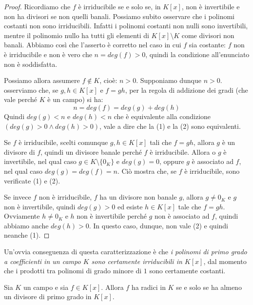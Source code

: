 \begin{proof}
Ricordiamo che $f$ è irriducibile se e solo se, in $K[x]$, non è invertibile e non ha divisori se non
	quelli banali. Possiamo subito osservare che i polinomi costanti non sono irriducibili. Infatti i polinomi costanti non nulli sono invertibili, mentre il polinomio nullo ha tutti gli elementi di $K[x] \setminus K$ come divisori non banali. Abbiamo così che l’asserto è corretto nel caso in cui $f$ sia costante: $f$ non è irriducibile e non è vero che $n = deg(f) > 0$, quindi la condizione all’enunciato non è soddisfatta. 
	
	Possiamo allora assumere $f \notin K$, cioè: $n > 0$. Supponiamo dunque $n > 0$. osserviamo che, se $g,h \in K[x]$ e $f=gh$, per la regola di addizione dei gradi (che vale perché $K$ è un campo) si ha:
	$$n=deg(f)=deg(g)+deg(h)$$
	Quindi $deg(g)<n$ e $deg(h)<n$ che è equivalente alla condizione $(deg(g)>0 \land deg(h)>0)$, vale a dire che la (1) e la (2) sono equivalenti. 
	
	Se $f$  è irriducibile, scelti comunque $g,h \in K[x]$ tali che $f=gh$, allora $g$ è un divisore di $f$, quindi un divisore banale perché $f$ è irriducibile. Allora o $g$ è invertibile, nel qual caso $g \in K \setminus \{0_{K}\}$ e $deg(g)=0$, oppure $g$ è associato ad $f$, nel qual caso $deg(g)=deg(f)=n$. Ciò mostra che, se $f$ è irriducibile, sono verificate (1) e (2). 
	
	Se invece $f$ non è irriducibile, $f$ ha un divisore non banale $g$, allora $g \neq 0_{K}$ e $g$ non è invertibile, quindi $deg(g)>0$ ed esiste $h \in K[x]$ tale che $f=gh$. Ovviamente $h \neq 0_{K}$ e $h$ non è invertibile perché $g$ non è associato ad $f$, quindi abbiamo anche $deg(h)>0$. In questo caso, dunque, non vale (2) e quindi neanche (1).
\end{proof}


\begin{osservation}
	Un’ovvia conseguenza di questa caratterizzazione è che \textit{i polinomi di primo grado a coefficienti in un campo $K$ sono certamente irriducibili in $K[x]$}, dal momento che i prodotti tra polinomi di grado minore di $1$ sono certamente costanti.
\end{osservation}



\begin{propbox}
	Sia $K$ un campo e sia $f \in K[x]$. Allora $f$ ha radici in $K$ se e solo se ha almeno un divisore di primo grado in $K[x]$.
\end{propbox}


